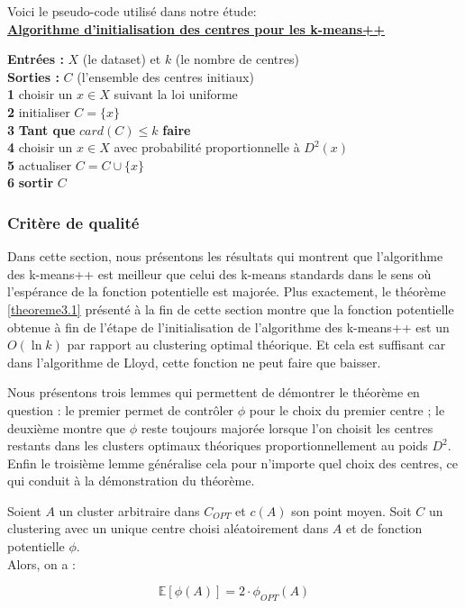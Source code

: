 \documentclass[12pt,a4paper]{book}
\newcommand{\E}{\mathbb{E}}
\newcommand{\1}{\mathds{1}}
\begin{document}
Voici le pseudo-code utilisé dans notre étude: \\

\noindent \textbf{\underline{Algorithme d'initialisation des centres pour les k-means++}}\label{algo_kmeans_pp}

\noindent \textbf{Entrées : } $X$ (le dataset) et $k$ (le nombre de centres)\\
\noindent \textbf{Sorties : } $C$ (l'ensemble des centres initiaux) \\
\textbf{1} choisir un $x \in X$ suivant la loi uniforme\\
\textbf{2} initialiser $C=\{x\}$\\
\textbf{3} \textbf{Tant que } $card(C) \leq k$ \textbf{faire}\\
\textbf{4} \indent choisir un $x \in X$ avec probabilité proportionnelle à $D^2(x)$\\
\textbf{5} \indent actualiser $C = C \cup \{x \}$\\
\textbf{6} \textbf{sortir} $C$ \\



\subsubsection{Critère de qualité}

Dans cette section, nous présentons les résultats qui montrent que l'algorithme des k-means++ est meilleur que celui des k-means standards dans le sens où l'espérance de la fonction potentielle est majorée. Plus exactement, le théorème \ref{theoreme3.1} présenté à la fin de cette section montre que la fonction potentielle obtenue à fin de l'étape de l'initialisation de l'algorithme des k-means++ est un $O(\ln k)$ par rapport au clustering optimal théorique. Et cela est suffisant car dans l'algorithme de Lloyd, cette fonction ne peut faire que baisser.

Nous présentons trois lemmes qui permettent de démontrer le théorème en question : le premier permet de contrôler $\phi$ pour le choix du premier centre ; le deuxième montre que $\phi$ reste toujours majorée lorsque l'on choisit les centres restants dans les clusters optimaux théoriques proportionnellement au poids $D^2$. Enfin le troisième lemme généralise cela pour n'importe quel choix des centres, ce qui conduit à la démonstration du théorème.

	\begin{env_lemme}\label{lemme3.1}
		Soient $A$ un cluster arbitraire dans $C_{OPT}$ et $c(A)$ son point moyen. Soit $C$ un clustering avec un unique centre choisi aléatoirement dans $A$ et de fonction potentielle $\phi$.\\
		Alors, on a :
		
		$$
			\E\left[\phi(A)\right] = 2 \cdot \phi_{OPT} \left( A \right)
		$$		
	\end{env_lemme}	
	
\end{document}
